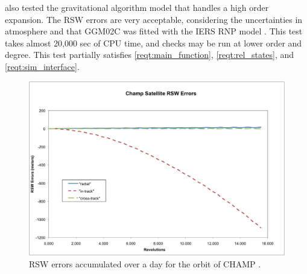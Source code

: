 \begin{description}
also tested the gravitational algorithm  model that handles a high order expansion.  The RSW
errors are very acceptable, considering the uncertainties in atmosphere and that GGM02C was
fitted with the IERS RNP model \cite{IERS2003}.  This test takes almost 20,000 sec of CPU time,
and checks may be run at lower order and degree.  This test partially satisfies
\ref{reqt:main_function}, \ref{reqt:rel_states}, and \ref{reqt:sim_interface}.
\newpage
\begin{figure}
\includegraphics [width=7in]{figs/champ/champ_err.png}
\caption{RSW errors accumulated over a day for the orbit of CHAMP .}
\label{fig:1}
\end{figure}

\end{description}
\clearpage
\newpage

